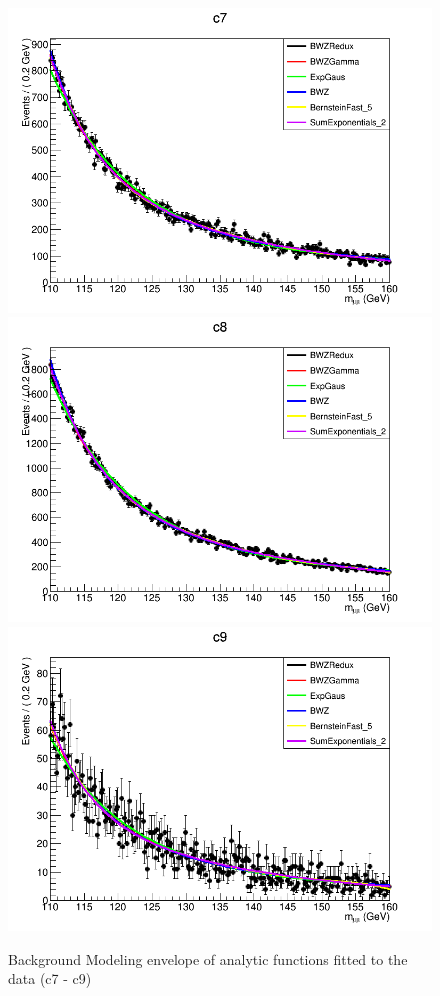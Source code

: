 \begin{figure}[htbp]
  \centering
  \includegraphics[width=0.65\linewidth]{figures/ch_higgs/backgroundmodel/uf_bdt/backgroundFits__c7__bkgModels.png}\\
  \includegraphics[width=0.65\linewidth]{figures/ch_higgs/backgroundmodel/uf_bdt/backgroundFits__c8__bkgModels.png}\\
  \includegraphics[width=0.65\linewidth]{figures/ch_higgs/backgroundmodel/uf_bdt/backgroundFits__c9__bkgModels.png}
  \caption{Background Modeling envelope of analytic functions fitted to the data (c7 - c9)}
  \label{fig:higgs_bmodel_bdtc7c9}
\end{figure}
